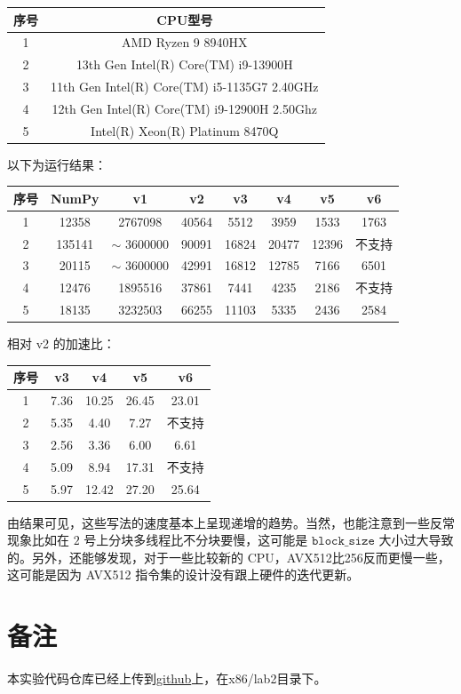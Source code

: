 \documentclass{article}
\begin{document}
\begin{center}
\begin{tabular}{c|c}
\textbf{序号} & \textbf{CPU型号} \\
\hline 
1 & AMD Ryzen 9 8940HX \\ 
2 & 13th Gen Intel(R) Core(TM) i9-13900H \\ 
3 & 11th Gen Intel(R) Core(TM) i5-1135G7 2.40GHz \\ 
4 & 12th Gen Intel(R) Core(TM) i9-12900H 2.50Ghz \\
5 & Intel(R) Xeon(R) Platinum 8470Q  \\ 
\end{tabular}
\end{center}

以下为运行结果：
\begin{center}
\begin{tabular}{c|c|c|c|c|c|c|c}
\textbf{序号} & \textbf{NumPy} & \textbf{v1} & \textbf{v2} & \textbf{v3} & \textbf{v4} & \textbf{v5} & \textbf{v6} \\
\hline 
1 & 12358 & 2767098 & 40564 & 5512 & 3959 & 1533 & 1763 \\ 
2 & 135141 & $\sim$ 3600000  & 90091 & 16824 & 20477 & 12396 & 不支持 \\ 
3 & 20115 & $\sim$ 3600000 & 42991 & 16812 & 12785 & 7166 & 6501 \\ 
4 & 12476 & 1895516 & 37861 & 7441 & 4235 & 2186 & 不支持 \\
5 & 18135 & 3232503 & 66255 & 11103 & 5335 & 2436 & 2584 \\ 
\end{tabular}
\end{center}

相对 v2 的加速比：
\begin{center}
\begin{tabular}{c|c|c|c|c}
\textbf{序号} & \textbf{v3} & \textbf{v4} & \textbf{v5} & \textbf{v6} \\
\hline 
1 & 7.36 & 10.25 & 26.45 & 23.01 \\ 
2 & 5.35 & 4.40 & 7.27 & 不支持 \\ 
3 & 2.56 & 3.36 & 6.00 & 6.61 \\ 
4 & 5.09 & 8.94 & 17.31 & 不支持 \\
5 & 5.97 & 12.42 & 27.20 & 25.64 \\ 
\end{tabular}
\end{center}

由结果可见，这些写法的速度基本上呈现递增的趋势。当然，也能注意到一些反常现象比如在 $2$ 号上分块多线程比不分块要慢，这可能是 $\texttt{block\_size}$ 大小过大导致的。另外，还能够发现，对于一些比较新的 CPU，AVX512比256反而更慢一些，这可能是因为 AVX512 指令集的设计没有跟上硬件的迭代更新。


\section{备注}

本实验代码仓库已经上传到\href{https://github.com/Symmetryagain/asm-learning/tree/main}{github}上，在x86/lab2目录下。
\end{document}
